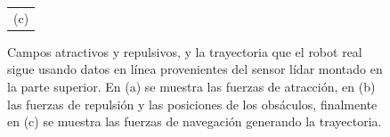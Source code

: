 \begin{figure}
\begin{tabular}{c}
      \multicolumn{1}{c}{(c)}
    \end{tabular}
  \captionsetup{font=footnotesize}
    \caption{\label{f:kbki_autonomo}Campos atractivos y repulsivos, y la trayectoria que el 
    robot real sigue usando datos en línea provenientes del sensor lídar montado en la parte 
    superior. En (a) se muestra las fuerzas de atracción, en (b) las fuerzas de repulsión y 
    las posiciones de los obsáculos, finalmente en (c) se muestra las fuerzas de navegación 
    generando la trayectoria.}
\end{figure}


